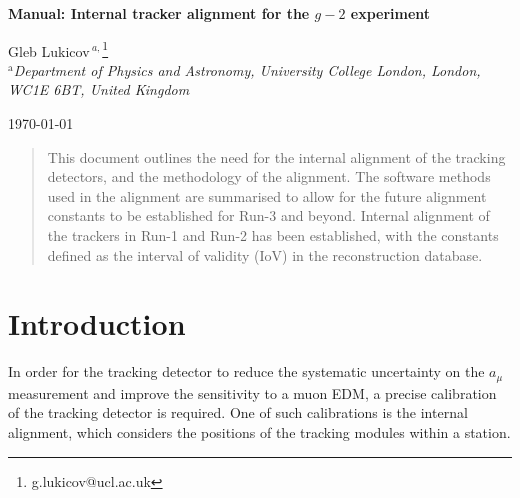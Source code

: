 \documentclass[12pt]{article}
\def\Title#1{\begin{center} {\Large {\bf #1} } \end{center}}
\begin{document}
\Title{Manual: Internal tracker alignment for the $g-2$ experiment}

\bigskip\bigskip


\begin{raggedright}  
Gleb Lukicov$\,^{a,}$\footnote{g.lukicov@ucl.ac.uk}\\
{\it $^{\mathrm{a}}$Department of Physics and Astronomy, University College London, London, \\ WC1E 6BT, United Kingdom}
\bigskip\bigskip
\end{raggedright}

\begin{center}
\today
\end{center}

\null\vspace{\fill}
\begin{abstract}
This document outlines the need for the internal alignment of the tracking detectors, and the methodology of the alignment. The software methods used in the alignment are summarised to allow for the future alignment constants to be established for Run-3 and beyond. Internal alignment of the trackers in Run-1 and Run-2 has been established, with the constants defined as the interval of validity (IoV) in the reconstruction database. 
\end{abstract}
\vspace{\fill}

\tableofcontents

\clearpage

\section{Introduction}
In order for the tracking detector to reduce the systematic uncertainty on the $a_{\mu}$ measurement and improve the sensitivity to a muon EDM, a precise calibration of the tracking detector is required. One of such calibrations is the internal alignment, which considers the positions of the tracking modules within a station. 
\end{document}
